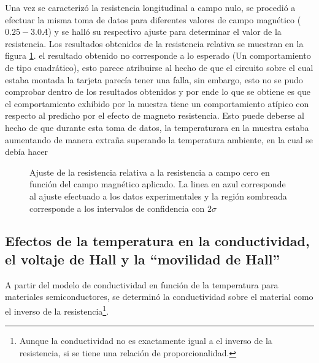 \documentclass[%
 reprint,
 amsmath,amssymb,
 aps,
]{revtex4-1}
\begin{document}
Una vez se caracterizó la resistencia longitudinal a campo nulo, se procedió a efectuar la misma toma de datos para diferentes valores de campo magnético ($0.25 - 3.0 A$) y se halló su respectivo ajuste para determinar el valor de la resistencia. Los resultados obtenidos de la resistencia relativa se muestran en la figura \ref{R_vs_Campo}. el resultado obtenido no corresponde a lo esperado (Un comportamiento de tipo cuadrático), esto parece atribuirse al hecho de que el circuito sobre el cual estaba montada la tarjeta parecía tener una falla, sin embargo, esto no se pudo comprobar dentro de los resultados obtenidos y por ende lo que se obtiene es que el comportamiento exhibido por la muestra tiene un comportamiento atípico con respecto al predicho por el efecto de magneto resistencia. Esto puede deberse al hecho de que durante esta toma de datos, la temperaturara en la muestra estaba aumentando de manera extraña superando la temperatura ambiente, en la cual se debía hacer 

\begin{figure}[h]
\caption{\label{R_vs_Campo}Ajuste de la resistencia relativa a la resistencia a campo cero en función del campo magnético aplicado.  La linea en azul corresponde al ajuste efectuado a los datos experimentales y la región sombreada corresponde a los intervalos de confidencia con $2\sigma$}
\end{figure}

\subsection{Efectos de la temperatura en la conductividad, el voltaje de Hall y la ``movilidad de Hall''}
A partir del modelo de conductividad en función de la temperatura para materiales semiconductores, se determinó la conductividad sobre el material como el inverso de la resistencia\footnote{Aunque la conductividad no es exactamente igual a el inverso de la resistencia, si se tiene una relación de proporcionalidad.}.
\end{document}
